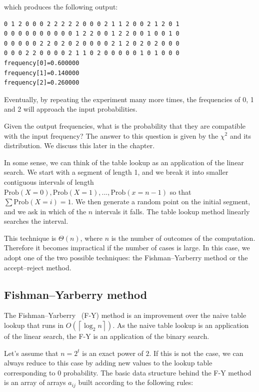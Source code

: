 \documentclass[justified, sixbynine]{tufte-book}
\theoremstyle{plain}%
\newtheorem * {corollary}{Corollary}
\theoremstyle{definition}
\theoremstyle{remark}
\newtheorem * {remark}{Remark}
\newtheorem * {note}{Note}
\begin{document}
\begin{fullwidth}
which produces the following output:

\begin{lstlisting}
0 1 2 0 0 0 2 2 2 2 2 0 0 0 2 1 1 2 0 0 2 1 2 0 1
0 0 0 0 0 0 0 0 0 0 1 2 2 0 0 1 2 2 0 0 1 0 0 1 0
0 0 0 0 0 2 2 0 2 0 2 0 0 0 0 2 1 2 0 2 0 2 0 0 0
0 0 0 2 2 0 0 0 0 2 1 1 0 2 0 0 0 0 0 1 0 1 0 0 0
frequency[0]=0.600000
frequency[1]=0.140000
frequency[2]=0.260000
\end{lstlisting}

Eventually, by repeating the experiment many more times, the frequencies of
0, 1 and 2 will approach the input probabilities.

Given the output frequencies, what is the probability that they are compatible with the input frequency?
The answer to this question is given by the $\chi^2$ and its distribution. We discuss this later in the chapter.

In some sense, we can think of the table lookup as an application of the
linear search. We start with a segment of length 1, and we break it into smaller
contiguous intervals of length $\textrm{Prob}(X=0), \textrm{Prob}(X=1), ..., \textrm{Prob}(x=n-1)$ so that $\sum
\textrm{Prob}(X=i)=1.$ We then generate a random point on the initial segment, and we ask
in which of the $n$ intervals it falls. The table lookup method linearly
searches the interval.

This technique is $\Theta (n)$, where $n$ is the number of outcomes of the
computation. Therefore it becomes impractical if the number of cases is
large. In this case, we adopt one of the two possible techniques: the
Fishman--Yarberry method or the accept--reject method.

\goodbreak\subsection{Fishman--Yarberry method}

The Fishman--Yarberry~\cite{fishman}  (F-Y) method is an improvement over the naive table
lookup that runs in $O(\left\lceil \log _2n\right\rceil )$. As the naive
table lookup is an application of the linear search, the F-Y is an
application of the binary search.

Let's assume that $n=2^t$ is an exact power of $2$. If this is not the case,
we can always reduce to this case by adding new values to the lookup table
corresponding to $0$ probability. The basic data structure behind the F-Y
method is an array of arrays $a_{ij}$ built according to the following rules:


\end{fullwidth}
\end{document}
